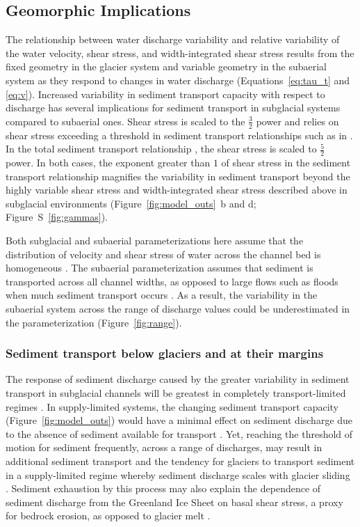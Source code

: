 \documentclass[11pt]{article}
\begin{document}
\begin{spacing}{1}
  \subsection{Geomorphic Implications}
  \label{sect:GI}
  The relationship between water discharge variability and relative variability of the water velocity, shear stress, and width-integrated shear stress results from the fixed geometry in the glacier system and variable geometry in the subaerial system as they respond to changes in water discharge (Equations~\ref{eq:tau_t} and \ref{eq:v}).
  Increased variability in sediment transport capacity with respect to discharge has several implications for sediment transport in subglacial systems compared to subaerial ones.
  Shear stress is scaled to the $\frac{3}{2}$ power and relies on shear stress exceeding a threshold in sediment transport relationships  such as in \citet{meyer1948}.
  In the total sediment transport relationship \citet{engelund1967}, the shear stress is scaled to $\frac{5}{2}$ power.
  In both cases, the exponent greater than $1$ of shear stress in the sediment transport relationship magnifies the variability in sediment transport beyond the highly variable shear stress and width-integrated shear stress described above in subglacial environments (Figure~\ref{fig:model_outs}\, b and d; Figure~S~\ref{fig:gammas}).


  Both subglacial and subaerial parameterizations here assume that the distribution of velocity and shear stress of water across the channel bed is homogeneous \citep[Section~\ref{sect:sub_mode}~and~\ref{sect:fluv}][]{yager2018}. 
  The subaerial parameterization assumes that sediment is transported across all channel widths, as opposed to large flows such as floods when much sediment transport occurs \citep{wolman1960}.
  As a result, the variability in the subaerial system across the range of discharge values could be underestimated in the parameterization (Figure~\ref{fig:range}).

  
  
  \subsubsection{Sediment transport below glaciers and at their margins}
  
  The response of sediment discharge caused by the greater variability in sediment transport in subglacial channels will be greatest in completely transport-limited regimes \citep[e.g.][]{kasmalkar2019}.
  In supply-limited systems, the changing sediment transport capacity (Figure~\ref{fig:model_outs}) would have a minimal effect on sediment discharge due to the absence of sediment available for transport \citep{delaney2019}.
  Yet, reaching the threshold of motion for sediment frequently, across a range of discharges,  may result in additional sediment transport and the tendency for glaciers to transport sediment in a supply-limited regime whereby sediment discharge scales with glacier sliding  \citep[e.g.][]{herman2015,koppes2015}.
  Sediment exhaustion by this process may also explain the dependence of sediment discharge from the Greenland Ice Sheet on basal shear stress, a proxy for bedrock erosion, as opposed to glacier melt \citep{overeem2017}.


\end{spacing}
\end{document}
